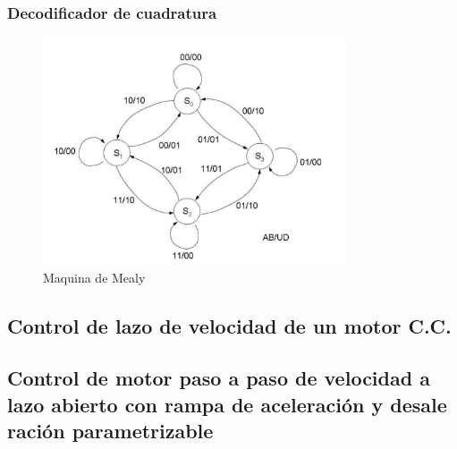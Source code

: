 \documentclass[11pt, a4paper]{article}
\begin{document}
		\subsubsection{Decodificador de cuadratura}
	
		\begin{figure}[h]
			\centering
			\includegraphics[width=0.8\textwidth]{Imagenes/mealy.jpg}
			\caption{Maquina de Mealy}
			\label{fig:mealy}
		\end{figure} 
	
	
	\subsection{Control de lazo de velocidad de un motor C.C.}


	\subsection{Control de motor paso a paso de velocidad a lazo abierto con rampa de aceleración y desale ración parametrizable}
\end{document}
